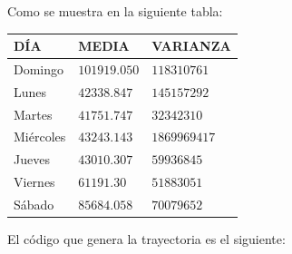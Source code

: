 \documentclass[
  us-letterpaper,
]{scrreprt}
\theoremstyle{plain}
\theoremstyle{plain}
\theoremstyle{definition}
\theoremstyle{remark}
\begin{document}
Como se muestra en la siguiente tabla:

\begin{longtable}[]{@{}lll@{}}
\toprule\noalign{}
DÍA & MEDIA & VARIANZA \\
\midrule\noalign{}
\endhead
\bottomrule\noalign{}
\endlastfoot
Domingo & \(101919.050\) & \(118310761\) \\
Lunes & \(42338.847\) & \(145157292\) \\
Martes & \(41751.747\) & \(32342310\) \\
Miércoles & \(43243.143\) & \(1869969417\) \\
Jueves & \(43010.307\) & \(59936845\) \\
Viernes & \(61191.30\) & \(51883051\) \\
Sábado & \(85684.058\) & \(70079652\) \\
\end{longtable}

El código que genera la trayectoria es el siguiente:
\end{document}
